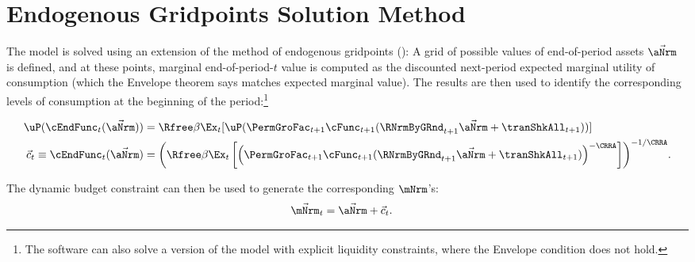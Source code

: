 \documentclass[\econtexRoot/BufferStockTheory]{subfiles}
\begin{document}
\section{Endogenous Gridpoints Solution Method}\label{sec:ApndxSolnMethEndogGpts}

The model is solved using an extension of the method of endogenous gridpoints (\cite{carroll_EGM}): A grid of possible values of end-of-period assets $\vec{\aNrm}$ is defined, and at these points, marginal end-of-period-$t$ value is computed as the discounted next-period expected marginal utility of consumption (which the Envelope theorem says matches expected marginal value).  The results are then used to identify the corresponding levels of consumption at the beginning of the period:\footnote{The software can also solve a version of the model with explicit liquidity constraints, where the Envelope condition does not hold.}

\begin{equation}\begin{gathered}\begin{aligned}
  \uP(\cEndFunc_{t}(\vec{\aNrm}))  & = \Rfree \beta \Ex_{t}[ \uP(\PermGroFac_{t+1}
  \cFunc_{t+1}(\RNrmByGRnd_{t+1}\vec{\aNrm} + \tranShkAll_{t+1}))] \label{eq:cEulerEndog}
\\ \vec{c}_{t} \equiv \cEndFunc_{t}(\vec{\aNrm})  & = {\left(\Rfree \beta \Ex_{t}\left[ {\left(\PermGroFac_{t+1}
      \cFunc_{t+1}(\RNrmByGRnd_{t+1}\vec{\aNrm} +
      \tranShkAll_{t+1})\right)}^{-\CRRA}\right]\right)}^{-1/\CRRA}. \notag
\end{aligned}\end{gathered}\end{equation}

The dynamic budget constraint can then be used to generate the corresponding $\mNrm$'s:
\begin{eqnarray*}
  \vec{\mNrm}_{t}  & = \vec{\aNrm}+\vec{c}_{t}.
\end{eqnarray*}
\end{document}
